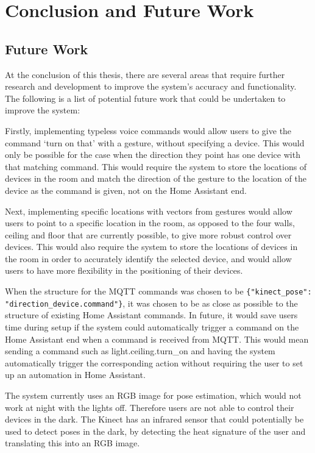 \chapter{Conclusion and Future Work}\label{ch:conclusion_future_work}

\section{Future Work}
At the conclusion of this thesis, there are several areas that require further research and development to improve the system's accuracy and functionality.
The following is a list of potential future work that could be undertaken to improve the system:

Firstly, implementing typeless voice commands would allow users to give the command `turn on that' with a gesture, without specifying a device.
This would only be possible for the case when the direction they point has one device with that matching command.
This would require the system to store the locations of devices in the room and match the direction of the gesture to the location of the device as the command is given, not on the Home Assistant end.

Next, implementing specific locations with vectors from gestures would allow users to point to a specific location in the room, as opposed to the four walls, ceiling and floor that are currently possible, to give more robust control over devices.
This would also require the system to store the locations of devices in the room in order to accurately identify the selected device, and would allow users to have more flexibility in the positioning of their devices.

When the structure for the MQTT commands was chosen to be \texttt{\{"kinect\_pose": "direction\_device.command"\}}, it was chosen to be as close as possible to the structure of existing Home Assistant commands.
In future, it would save users time during setup if the system could automatically trigger a command on the Home Assistant end when a command is received from MQTT.
This would mean sending a command such as light.ceiling.turn\_on and having the system automatically trigger the corresponding action without requiring the user to set up an automation in Home Assistant.

The system currently uses an RGB image for pose estimation, which would not work at night with the lights off.
Therefore users are not able to control their devices in the dark.
The Kinect has an infrared sensor that could potentially be used to detect poses in the dark, by detecting the heat signature of the user and translating this into an RGB image.

